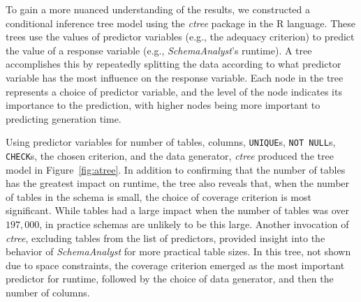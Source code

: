 
To gain a more nuanced understanding of the results, we constructed a conditional inference tree model using the
\textit{ctree} package in the R language. These trees use the values of predictor variables (e.g., the adequacy
criterion) to predict the value of a response variable (e.g., {\em SchemaAnalyst}'s runtime). A tree accomplishes this
by repeatedly splitting the data according to what predictor variable has the most influence on the response variable.
Each node in the tree represents a choice of predictor variable, and the level of the node indicates its importance to
the prediction, with higher nodes being more important to predicting generation time.



Using predictor variables for number of tables, columns, {\tt UNIQUE}s, {\tt NOT NULL}s, {\tt CHECK}s, the chosen
criterion, and the data generator, \textit{ctree} produced the tree model in Figure~\ref{fig:atree}.  In addition to
confirming that the number of tables has the greatest impact on runtime, the tree also reveals that, when the number of
tables in the schema is small, the choice of coverage criterion is most significant.  While tables had a large impact
when the number of tables was over $197,000$, in practice schemas are unlikely to be this large. Another invocation of
\textit{ctree}, excluding tables from the list of predictors, provided insight into the behavior of
\textit{SchemaAnalyst} for more practical table sizes. In this tree, not shown due to space constraints, the coverage
criterion emerged as the most important predictor for runtime, followed by the choice of data generator, and then the
number of columns.

